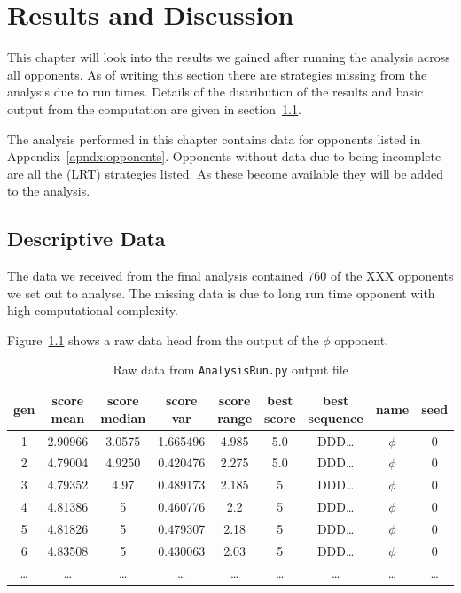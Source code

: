 \chapter{Results and Discussion}\label{ch:results}
This chapter will look into the results we gained after running the analysis across all opponents.
As of writing this section there are strategies missing from the analysis due to run times.
Details of the distribution of the results and basic output from the computation are given in section~\ref{sec:descriptive_data}.

The analysis performed in this chapter contains data for opponents listed in Appendix~\ref{apndx:opponents}.
Opponents without data due to being incomplete are all the (LRT) strategies listed.
As these become available they will be added to the analysis.

\section{Descriptive Data}\label{sec:descriptive_data}
The data we received from the final analysis contained 760 of the XXX opponents we set out to analyse.
The missing data is due to long run time opponent with high computational complexity.

Figure~\ref{table:data_dump} shows a raw data head from the output of the $\phi$ opponent.

\begin{table}[ht]
    \centering
    \begin{tabular}{ccccccccc}
        \toprule
        gen & score mean & score median & score var & score range & best score & best sequence &  name & seed \\
        \midrule
        1 & 2.90966 & 3.0575 & 1.665496 & 4.985 & 5.0 & DDD\ldots & $\phi$ & 0 \\
        2 & 4.79004 & 4.9250 & 0.420476 & 2.275 & 5.0 & DDD\ldots & $\phi$ & 0\\
        3 & 4.79352 & 4.97 & 0.489173 & 2.185 & 5 & DDD\ldots & $\phi$ & 0\\
        4 & 4.81386 & 5 & 0.460776 & 2.2 & 5 & DDD\ldots & $\phi$ & 0\\
        5 & 4.81826 & 5 & 0.479307 & 2.18 & 5 & DDD\ldots & $\phi$ & 0\\
        6 & 4.83508 & 5 & 0.430063 & 2.03 & 5 & DDD\ldots & $\phi$ & 0\\
        \ldots & \ldots & \ldots & \ldots & \ldots & \ldots & \ldots & \ldots & \ldots\\        
        \bottomrule
    \end{tabular}
    \caption{Raw data from \texttt{AnalysisRun.py} output file}\label{table:data_dump}
\end{table}

